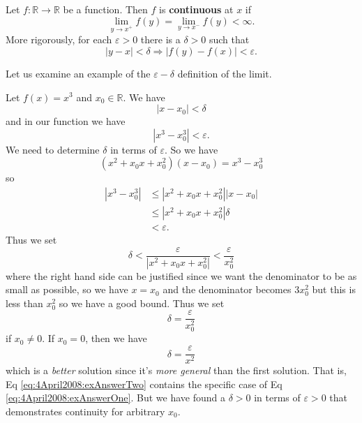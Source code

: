 \begin{defn}
Let $f:\mathbb{R}\to\mathbb{R}$ be a function. Then $f$ is
\textbf{continuous}
at $x$ if
\begin{equation}
\lim_{y\to x^{+}}f(y) = \lim_{y\to x^{-}}f(y) < \infty.
\end{equation}
More rigorously, for each $\varepsilon>0$ there is a
$\delta>0$ such that
\begin{equation}
|y-x|<\delta\Rightarrow|f(y)-f(x)|<\varepsilon.
\end{equation}
\end{defn}

Let us examine an example of the $\varepsilon-\delta$
definition of the limit.

\begin{ex}
Let $f(x)=x^{3}$ and $x_{0}\in\mathbb{R}$. We have
\begin{equation}
|x-x_{0}|<\delta
\end{equation}
and in our function we have
\begin{equation}
|x^{3} - x_{0}^{3}| < \varepsilon.
\end{equation}
We need to determine $\delta$ in terms of $\varepsilon$. So
we have
\begin{equation}
(x^2 + x_{0}x + x_{0}^{2})(x - x_{0}) = x^{3} - x_{0}^{3}
\end{equation}
so
\begin{subequations}
\begin{align}
|x^{3} - x_{0}^{3}|&\leq |x^2 + x_{0}x + x_{0}^{2}||x-x_{0}|\\
&\leq |x^2 + x_{0}x + x_{0}^{2}|\delta \\
&< \varepsilon.
\end{align}
\end{subequations}
Thus we set
\begin{equation}
\delta < \frac{\varepsilon}{|x^2 + x_{0}x + x_{0}^{2}|} <
\frac{\varepsilon}{x_{0}^{2}}
\end{equation}
where the right hand side can be justified since we want the
denominator to be as small as possible, so we have $x=x_{0}$
and the denominator becomes $3x_{0}^{2}$ but this is less
than $x_{0}^{2}$ so we have a good bound. Thus we set
\begin{equation}\label{eq:4April2008:exAnswerOne}
\delta = \frac{\varepsilon}{x_{0}^{2}}
\end{equation}
if $x_{0}\neq 0$. If $x_{0}=0$, then we have
\begin{equation}\label{eq:4April2008:exAnswerTwo}
\delta = \frac{\varepsilon}{x^2}
\end{equation}
which is a \emph{better} solution since it's \emph{more
  general} than the first solution. That is, Eq
\eqref{eq:4April2008:exAnswerTwo} contains the specific case
of Eq \eqref{eq:4April2008:exAnswerOne}. But we have found a
$\delta>0$ in terms of $\varepsilon>0$ that demonstrates
continuity for arbitrary $x_0$.
\end{ex}

